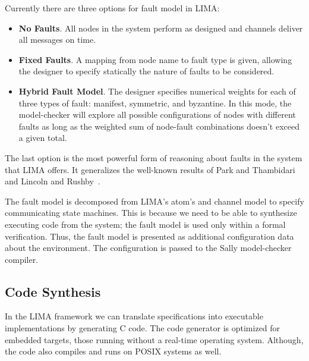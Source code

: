 Currently there are three options for fault model in LIMA:

\begin{itemize}
    \item \textbf{No Faults}. All nodes in the system perform as designed and channels
        deliver all messages on time.
    \item \textbf{Fixed Faults}. A mapping from node name to fault type is given,
        allowing the designer to specify statically the nature of faults to be
        considered.
    \item \textbf{Hybrid Fault Model}. The designer specifies numerical weights for
        each of three types of fault: manifest, symmetric, and byzantine. In
        this mode, the model-checker will explore all possible configurations
        of nodes with different faults as long as the weighted sum of
        node-fault combinations doesn't exceed a given total.
\end{itemize}
%
The last option is the most powerful form of reasoning about faults in the
system that LIMA offers. It generalizes the well-known results of Park and
Thambidari~\cite{Tha88:RDSS} and Lincoln and Rushby~\cite{Lincoln-Rushby}.

The fault model is decomposed from LIMA's atom's and channel model to specify communicating state machines. This is because we need to be able to synthesize executing code from the system; the fault model is used only within a formal verification. Thus, the fault model is presented as additional configuration data about the environment. The configuration is passed to the Sally model-checker compiler.




\subsection{Code Synthesis}\label{ssec:code}

In the LIMA framework we can translate specifications into executable
implementations by generating C code. The code generator is optimized for
embedded targets, those running without a real-time operating system. Although,
the code also compiles and runs on POSIX systems as well.

